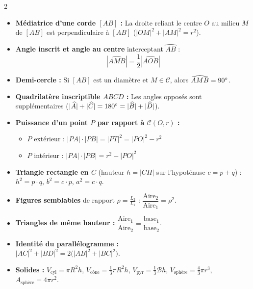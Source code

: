 {\fontsize{9.2pt}{11.2pt}\selectfont
\setlength{\columnsep}{18pt}
\begin{multicols}{2}

\begin{itemize}[leftmargin=1.2em, itemsep=1.5pt, topsep=2pt]
    \item \textbf{Médiatrice d'une corde $[AB]$ :} La droite reliant le centre $O$ au milieu $M$ de $[AB]$ est perpendiculaire à $[AB]$ ($|OM|^2 + |AM|^2 = r^2$).
    \item \textbf{Angle inscrit et angle au centre} interceptant $\wideparen{AB}$ :
    \[
        |\widehat{AMB}| = \frac{1}{2}|\widehat{AOB}|
    \]
    \item \textbf{Demi-cercle :} Si $[AB]$ est un diamètre et $M \in \mathcal{C}$, alors $\widehat{AMB} = 90\degree$.
    \item \textbf{Quadrilatère inscriptible $ABCD$ :} Les angles opposés sont supplémentaires ($|\widehat{A}| + |\widehat{C}| = 180\degree = |\widehat{B}| + |\widehat{D}|$).
    \item \textbf{Puissance d'un point $P$ par rapport à $\mathcal{C}(O,r)$ :}
    \begin{itemize}[leftmargin=1em, itemsep=1pt, topsep=1pt]
        \item $P$ extérieur : $|PA|\cdot|PB| = |PT|^2 = |PO|^2 - r^2$
        \item $P$ intérieur : $|PA|\cdot|PB| = r^2 - |PO|^2$
    \end{itemize}
\end{itemize}

\vspace{3pt}
\begin{itemize}[leftmargin=1.2em, itemsep=1.5pt, topsep=2pt]
    \item \textbf{Triangle rectangle en $C$} (hauteur $h = |CH|$ sur l'hypoténuse $c = p + q$) : $h^2 = p\cdot q$, \; $b^2 = c\cdot p$, \; $a^2 = c\cdot q$.
    \item \textbf{Figures semblables} de rapport $\rho = \frac{L_2}{L_1}$ : $\dfrac{\text{Aire}_2}{\text{Aire}_1} = \rho^2$.
    \item \textbf{Triangles de même hauteur :} $\dfrac{\text{Aire}_1}{\text{Aire}_2} = \dfrac{\text{base}_1}{\text{base}_2}$.
    \item \textbf{Identité du parallélogramme :}\\
    $|AC|^2 + |BD|^2 = 2\bigl(|AB|^2 + |BC|^2\bigr)$.
    \item \textbf{Solides :} $V_{\text{cyl}} = \pi R^2 h$, \; $V_{\text{cône}} = \frac{1}{3}\pi R^2 h$, \; $V_{\text{pyr}} = \frac{1}{3}\mathcal{B}h$, \; $V_{\text{sphère}} = \frac{4}{3}\pi r^3$, \; $A_{\text{sphère}} = 4\pi r^2$.
\end{itemize}


\end{multicols}}
